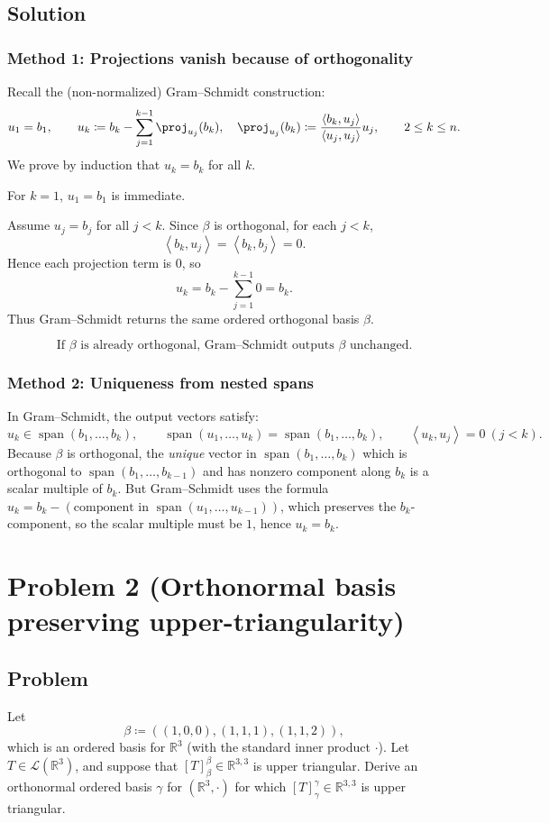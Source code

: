 \documentclass[12pt]{article}
\newcommand{\df}{\coloneqq}
\newcommand{\R}{\mathbb{R}}
\newcommand{\cL}{\mathcal{L}}
\DeclareMathOperator{\Span}{span}
\newcommand{\ip}[2]{\left\langle #1,#2\right\rangle}
\begin{document}
\subsection{Solution}

\subsubsection{Method 1: Projections vanish because of orthogonality}
Recall the (non-normalized) Gram--Schmidt construction:
\[
u_1=b_1,\qquad
u_k \df b_k-\sum_{j=1}^{k-1}\proj_{u_j}(b_k),
\quad
\proj_{u_j}(b_k)\df \frac{\ip{b_k}{u_j}}{\ip{u_j}{u_j}}u_j,\qquad 2\le k\le n.
\]
We prove by induction that $u_k=b_k$ for all $k$.

For $k=1$, $u_1=b_1$ is immediate.

Assume $u_j=b_j$ for all $j<k$. Since $\beta$ is orthogonal, for each $j<k$,
\[
\ip{b_k}{u_j}=\ip{b_k}{b_j}=0.
\]
Hence each projection term is $0$, so
\[
u_k=b_k-\sum_{j=1}^{k-1} 0=b_k.
\]
Thus Gram--Schmidt returns the same ordered orthogonal basis $\beta$.

\[
\boxed{\,\text{If }\beta\text{ is already orthogonal, Gram--Schmidt outputs }\beta\text{ unchanged.}\,}
\]

\subsubsection{Method 2: Uniqueness from nested spans}
In Gram--Schmidt, the output vectors satisfy:
\[
u_k\in \Span(b_1,\dots,b_k),
\qquad
\Span(u_1,\dots,u_k)=\Span(b_1,\dots,b_k),
\qquad
\ip{u_k}{u_j}=0\ (j<k).
\]
Because $\beta$ is orthogonal, the \emph{unique} vector in $\Span(b_1,\dots,b_k)$ which is orthogonal to
$\Span(b_1,\dots,b_{k-1})$ and has nonzero component along $b_k$ is a scalar multiple of $b_k$.
But Gram--Schmidt uses the formula $u_k=b_k-(\text{component in }\Span(u_1,\dots,u_{k-1}))$, which preserves the $b_k$-component,
so the scalar multiple must be $1$, hence $u_k=b_k$.

\newpage
\section{Problem 2 (Orthonormal basis preserving upper-triangularity)}
\subsection{Problem}
Let
\[
\beta \df ((1,0,0),(1,1,1),(1,1,2)),
\]
which is an ordered basis for $\R^3$ (with the standard inner product $\cdot$).
Let $T\in \cL(\R^3)$, and suppose that $[T]_{\beta}^{\beta}\in \R^{3,3}$ is upper triangular.
Derive an orthonormal ordered basis $\gamma$ for $(\R^3,\cdot)$ for which $[T]_{\gamma}^{\gamma}\in\R^{3,3}$ is upper triangular.
\end{document}
